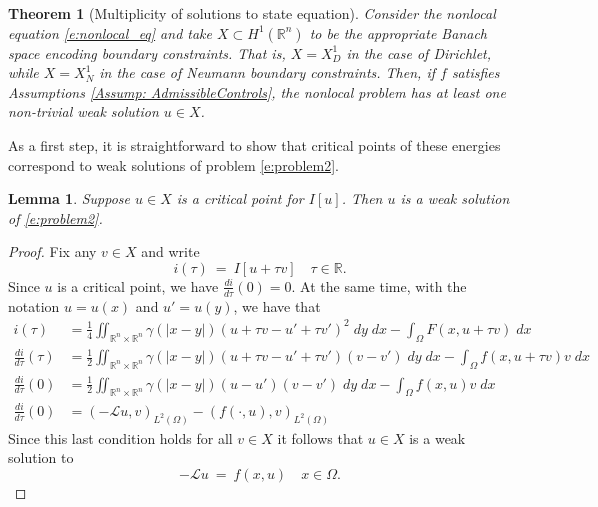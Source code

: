 \documentclass[11pt]{amsart}   	%
\theoremstyle{plain}
\numberwithin{equation}{section}
\newtheorem{theorem}[thm]{Theorem}
\newtheorem{lemma}[thm]{Lemma}
\def\R{\mathbb{R}}
\begin{document}
\begin{theorem}[Multiplicity of solutions to state equation]\label{Thm: Multiplicity}
  Consider the nonlocal equation \eqref{e:nonlocal_eq} and take $X\subset H^1(\R^n)$ to be the appropriate Banach space encoding  boundary constraints. That is, $X = X^1_D$ in the case of Dirichlet, while $X = X^1_N$ in the case of Neumann boundary constraints.
Then, if $f $ satisfies Assumptions \ref{Assump: AdmissibleControls},  the nonlocal problem has at least one non-trivial weak solution $u \in X$.
\end{theorem}

As a first step, it is straightforward to show that
critical points of these energies correspond to weak solutions of problem \eqref{e:problem2}.

\begin{lemma}\label{l:bilinear}
Suppose $u  \in X$ is a critical point for $I[u]$. Then  $u$ is a weak solution of \eqref{e:problem2}.

\end{lemma}
\begin{proof}
Fix any $v \in X$ and write
\[ i(\tau) \ = \ I [u + \tau v] \quad \tau \in \R.\]
Since $u$ is a critical point, we have $\frac{d i}{d\tau} (0) = 0$. 
At the same time, with the notation $u = u(x)$ and $u' = u(y)$, we have that
\begin{equation*}
\begin{aligned}
i(\tau) & =  \frac{1}{4} \iint_{\R^n \times \R^n} \gamma(|x-y|) (u+ \tau v - u' + \tau v')^2 \;dy \;dx - \int_\Omega F(x,u+ \tau v) \;dx\\
\frac{d i}{d\tau} (\tau) & =  \frac{1}{2}  \iint_{\R^n \times \R^n} \gamma(|x-y|) (u+ \tau v - u' + \tau v')(v-v') \;dy \;dx - \int_\Omega f(x,u+ \tau v) v \;dx\\
\frac{d i}{d\tau} (0) & =  \frac{1}{2}  \iint_{\R^n \times \R^n} \gamma(|x-y|) (u - u')(v-v') \;dy \;dx - \int_\Omega f(x,u) v \;dx\\
\frac{d i}{d\tau} (0) & =  ( -\mathcal{L} u, v)_{L^2(\Omega)} - ( f(\cdot,u) , v)_{L^2(\Omega)}
\end{aligned}
\end{equation*}
Since this last condition holds for all $v  \in X$ it follows that $u\in X$  is a weak solution to
\[ -\mathcal{L} u \ = \ f(x,u) \quad x \in \Omega.\]



\end{proof}
\end{document}
